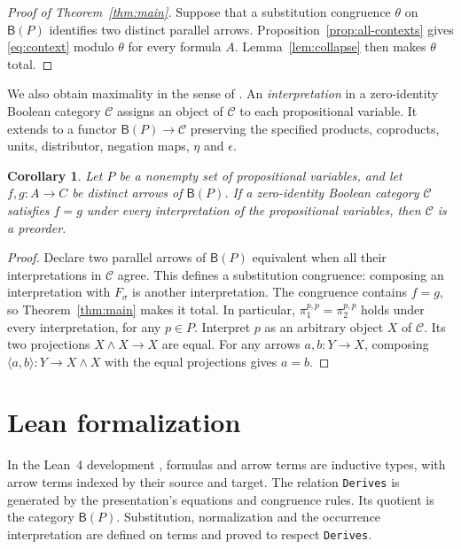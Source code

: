 \documentclass[11pt]{article}
\newtheorem{corollary}[theorem]{Corollary}
\newcommand{\B}{\mathsf B}
\begin{document}
\begin{proof}[Proof of Theorem~\ref{thm:main}]
Suppose that a substitution congruence $\theta$ on $\B(P)$ identifies
two distinct parallel arrows. Proposition~\ref{prop:all-contexts}
gives \eqref{eq:context} modulo $\theta$ for every formula $A$.
Lemma~\ref{lem:collapse} then makes $\theta$ total.
\end{proof}

We also obtain maximality in the sense of
\cite[\S9.3, p.~194]{DP}. An \emph{interpretation} in a zero-identity
Boolean category $\mathcal C$ assigns an object of $\mathcal C$ to
each propositional variable. It extends to a functor
$\B(P)\to\mathcal C$ preserving the specified products, coproducts,
units, distributor, negation maps, $\eta$ and $\epsilon$.

\begin{corollary}\label{cor:models}
Let $P$ be a nonempty set of propositional variables, and let
$f,g:A\to C$ be distinct arrows of $\B(P)$.
If a zero-identity Boolean category $\mathcal C$ satisfies $f=g$
under every interpretation of the propositional variables, then
$\mathcal C$ is a preorder.
\end{corollary}

\begin{proof}
Declare two parallel arrows of $\B(P)$ equivalent when all their
interpretations in $\mathcal C$ agree. This defines a substitution
congruence: composing an interpretation with $F_\sigma$ is another
interpretation. The congruence contains $f=g$, so
Theorem~\ref{thm:main} makes it total. In particular,
$\pi_1^{p,p}=\pi_2^{p,p}$ holds under every interpretation, for any
$p\in P$. Interpret $p$ as an arbitrary object $X$ of $\mathcal C$.
Its two projections $X\wedge X\to X$ are equal. For any arrows $a,b:Y\to X$, composing
$\langle a,b\rangle:Y\to X\wedge X$ with the equal projections gives $a=b$.
\end{proof}

\section{Lean formalization}\label{sec:formalization}

In the Lean~4 development \cite{Formalization}, formulas and arrow
terms are inductive types, with arrow terms indexed by their source
and target. The relation \texttt{Derives} is generated by the
presentation's equations and congruence rules. Its quotient is the
category $\B(P)$. Substitution, normalization and the occurrence
interpretation are defined on terms and proved to respect
\texttt{Derives}.
\end{document}
